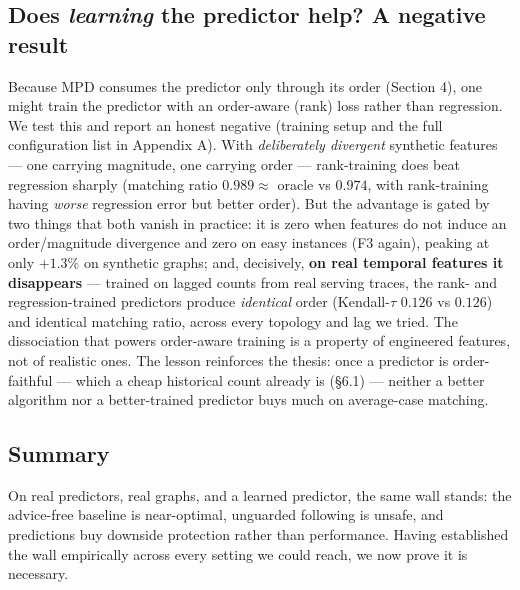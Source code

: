 \subsection{\texorpdfstring{Does \emph{learning} the predictor help? A
negative
result}{Does learning the predictor help? A negative result}}

Because MPD consumes the predictor only through its order (Section 4),
one might train the predictor with an order-aware (rank) loss rather
than regression. We test this and report an honest negative (training
setup and the full configuration list in Appendix A). With
\emph{deliberately divergent} synthetic features --- one carrying
magnitude, one carrying order --- rank-training does beat regression
sharply (matching ratio \(0.989\approx\) oracle vs \(0.974\), with
rank-training having \emph{worse} regression error but better order).
But the advantage is gated by two things that both vanish in practice:
it is zero when features do not induce an order/magnitude divergence and
zero on easy instances (F3 again), peaking at only \(+1.3\%\) on
synthetic graphs; and, decisively, \textbf{on real temporal features it
disappears} --- trained on lagged counts from real serving traces, the
rank- and regression-trained predictors produce \emph{identical} order
(Kendall-\(\tau\) \(0.126\) vs \(0.126\)) and identical matching ratio,
across every topology and lag we tried. The dissociation that powers
order-aware training is a property of engineered features, not of
realistic ones. The lesson reinforces the thesis: once a predictor is
order-faithful --- which a cheap historical count already is (§6.1) ---
neither a better algorithm nor a better-trained predictor buys much on
average-case matching.

\subsection{Summary}

On real predictors, real graphs, and a learned predictor, the same wall
stands: the advice-free baseline is near-optimal, unguarded following is
unsafe, and predictions buy downside protection rather than performance.
Having established the wall empirically across every setting we could
reach, we now prove it is necessary.
